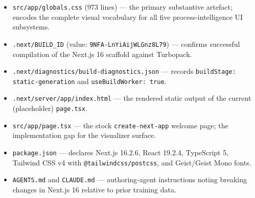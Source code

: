 \begin{itemize}
  \item \texttt{src/app/globals.css} (973 lines) --- the primary substantive artefact;
        encodes the complete visual vocabulary for all five process-intelligence UI subsystems.
  \item \texttt{.next/BUILD\_ID} (value: \texttt{9NFA-LnYiAijWLGnz8L79}) --- confirms
        successful compilation of the Next.js 16 scaffold against Turbopack.
  \item \texttt{.next/diagnostics/build-diagnostics.json} --- records
        \texttt{buildStage: static-generation} and \texttt{useBuildWorker: true}.
  \item \texttt{.next/server/app/index.html} --- the rendered static output of the current
        (placeholder) \texttt{page.tsx}.
  \item \texttt{src/app/page.tsx} --- the stock \texttt{create-next-app} welcome page;
        the implementation gap for the visualizer surface.
  \item \texttt{package.json} --- declares Next.js 16.2.6, React 19.2.4, TypeScript 5,
        Tailwind CSS v4 with \texttt{@tailwindcss/postcss}, and Geist/Geist Mono fonts.
  \item \texttt{AGENTS.md} and \texttt{CLAUDE.md} --- authoring-agent instructions noting
        breaking changes in Next.js 16 relative to prior training data.
\end{itemize}
